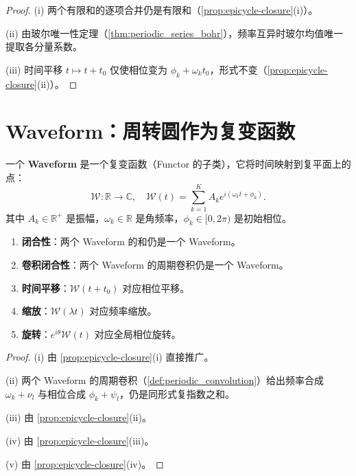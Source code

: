 \begin{proof}
(i) 两个有限和的逐项合并仍是有限和（\cref{prop:epicycle-closure}(i)）。

(ii) 由玻尔唯一性定理（\cref{thm:periodic_series_bohr}），频率互异时玻尔均值唯一提取各分量系数。

(iii) 时间平移 $t \mapsto t + t_0$ 仅使相位变为 $\phi_k + \omega_k t_0$，形式不变（\cref{prop:epicycle-closure}(ii)）。
\end{proof}

\section{Waveform：周转圆作为复变函数}

\begin{definition}\label{def:waveform_definition}
一个 \textbf{Waveform} 是一个复变函数（Functor 的子类），它将时间映射到复平面上的点：
\[
\mathcal{W}: \mathbb{R} \to \mathbb{C}, \quad \mathcal{W}(t) = \sum_{k=1}^{K} A_k e^{i(\omega_k t + \phi_k)}.
\]
其中 $A_k \in \mathbb{R}^+$ 是振幅，$\omega_k \in \mathbb{R}$ 是角频率，$\phi_k \in [0, 2\pi)$ 是初始相位。
\end{definition}

\begin{property}\label{prop:waveform_properties}
\begin{enumerate}[label=(\roman*)]
    \item \textbf{闭合性}：两个 Waveform 的和仍是一个 Waveform。
    \item \textbf{卷积闭合性}：两个 Waveform 的周期卷积仍是一个 Waveform。
    \item \textbf{时间平移}：$\mathcal{W}(t + t_0)$ 对应相位平移。
    \item \textbf{缩放}：$\mathcal{W}(\lambda t)$ 对应频率缩放。
    \item \textbf{旋转}：$e^{i\theta} \mathcal{W}(t)$ 对应全局相位旋转。
\end{enumerate}
\end{property}

\begin{proof}
(i) 由 \cref{prop:epicycle-closure}(i) 直接推广。

(ii) 两个 Waveform 的周期卷积（\cref{def:periodic_convolution}）给出频率合成 $\omega_k + \nu_l$ 与相位合成 $\phi_k + \psi_l$，仍是同形式复指数之和。

(iii) 由 \cref{prop:epicycle-closure}(ii)。

(iv) 由 \cref{prop:epicycle-closure}(iii)。

(v) 由 \cref{prop:epicycle-closure}(iv)。
\end{proof}

